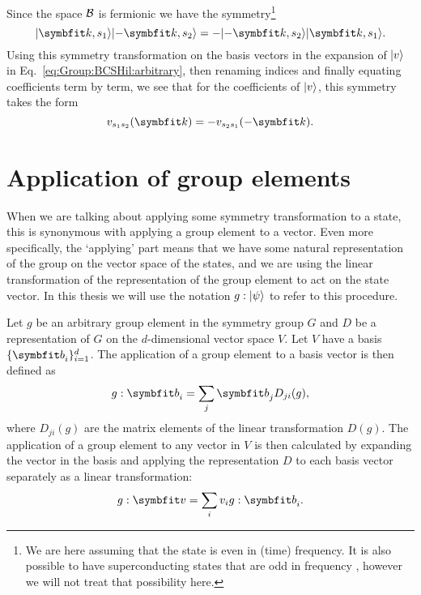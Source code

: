Since the space $\mathcal{B}$ is fermionic we have the symmetry\footnote{We are here assuming that the state is even in (time) frequency. It is also possible
to have superconducting states that are odd in frequency \cite{Pal17}, however we will not treat that possibility here.}
\begin{equation}
    \label{eq:Group:BCSHil:fermSymm}
    \ket{\v{k},s_1}\ket{-\v{k},s_2} = -\ket{-\v{k},s_2}\ket{\v{k},s_1}.
\end{equation}
Using this symmetry transformation on the basis vectors in the expansion of $\lvert v \rangle$ in Eq.~\eqref{eq:Group:BCSHil:arbitrary}, then renaming indices
and finally equating coefficients term by term, we see that for the coefficients of $\lvert v \rangle$, this symmetry takes the form
\begin{equation}
    \label{eq:GroupBCSHil:fermSymmCoeff}
    v_{s_1s_2}(\v{k}) = -v_{s_2s_1}(-\v{k}).
\end{equation}


\section{Application of group elements}

When we are talking about applying some symmetry transformation to a state, this is synonymous with applying a group element to a vector.
Even more specifically, the `applying' part means that we have some natural representation of the group on the vector space of the 
states, and we are using the linear transformation of the representation of the group element to act on the state vector. In this
thesis we will use the notation $g:\lvert \psi \rangle$ to refer to this procedure.

Let $g$ be an arbitrary group element in the symmetry group $G$ and $D$ be a representation of $G$ on the $d$-dimensional vector space $V$.
Let $V$ have a basis $\{\v{b}_i\}_{i=1}^d$. The application of a group element to a basis vector is then defined as
\begin{equation}
    \label{eq:Group:Prod:basisApp}
    g:\v{b}_i = \sum_j\v{b}_jD_{ji}(g),
\end{equation}
where $D_{ji}(g)$ are the matrix elements of the linear transformation $D(g)$.
The application of a group element to any vector in $V$ is then calculated by expanding the vector in the basis and applying the representation
$D$ to each basis vector separately as a linear transformation:
\begin{equation}
    \label{eq:Group:App:linearTransformApp}
    g:\v{v} = \sum_iv_ig:\v{b}_i.
\end{equation}

